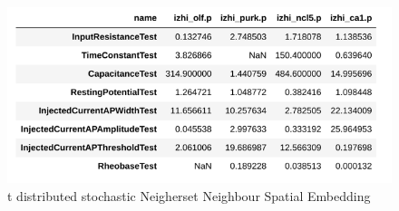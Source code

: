 \begin{figure}
	\includegraphics[width=\maxwidth{\textwidth}]{figures/results_izhi_models.png}
	\caption{t distributed stochastic Neigherset Neighbour Spatial Embedding}
	\label{figure\arabic{figurecounter}}
\end{figure}

